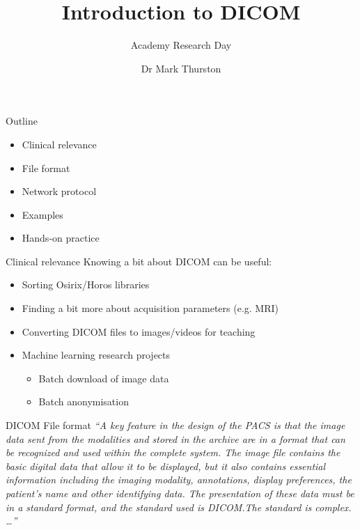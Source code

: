 \documentclass{beamer}
\title{Introduction to DICOM}
\subtitle{Academy Research Day}
\author{Dr Mark Thurston}
\institute{\href{https://github.com/plymouth-neuroimaging/research-academy
    }{\faGithub{} plymouth-neuroimaging}
}
\date{\DTMdisplaydate{2023}{07}{28}{Friday}}
\begin{document}
\begin{frame}
    \titlepage{}
\end{frame}

\begin{frame}{Outline}
    \begin{itemize}
        \item{Clinical relevance}
        \item{File format}
        \item{Network protocol}
        \item{Examples}
        \item{Hands-on practice}
    \end{itemize}
\end{frame}

\begin{frame}{Clinical relevance}
    Knowing a bit about DICOM can be useful:
    \begin{itemize}
        \item{Sorting Osirix/Horos libraries}
        \item{Finding a bit more about acquisition parameters (e.g. MRI)}
        \item{Converting DICOM files to images/videos for teaching}
        \item{Machine learning research projects}
            \begin{itemize}
                \item{Batch download of image data}
                \item{Batch anonymisation}
            \end{itemize}
    \end{itemize}
\end{frame}

\begin{frame}{DICOM File format}
    \tiny\textit{{``A key feature in the design of the PACS is that the image
    data sent from the modalities and stored in the archive are in a format
    that can be recognized and used within the complete system. The image file
    contains the basic digital data that allow it to be displayed, but it also
    contains essential information including the imaging modality, annotations,
    display preferences, the patient’s name and other identifying data. The
    presentation of these data must be in a standard format, and the standard
    used is DICOM.\@ The standard is complex. \ldots{}}''
    }\cite[88]{allisy-roberts_farrs_2008}
\end{frame}
\end{document}
